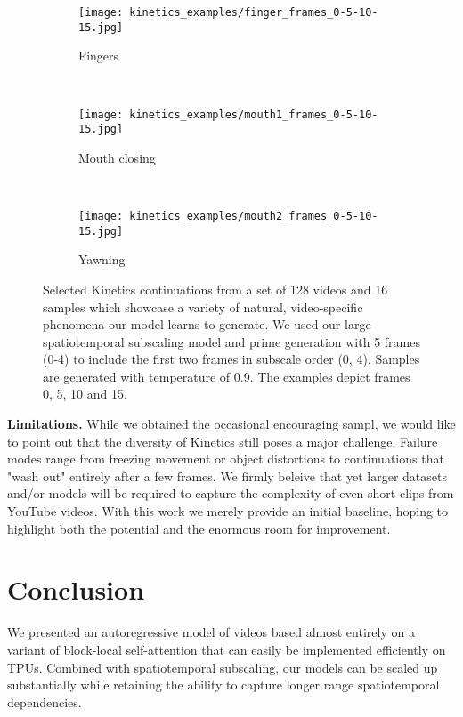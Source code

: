 \documentclass{article} \usepackage{iclr2020_conference,times}
\begin{document}
\begin{figure}[t]
    \begin{subfigure}{0.31\textwidth}
    \texttt{[image: kinetics\_examples/finger\_frames\_0-5-10-15.jpg]}\vspace{-0.5em}
    \caption{Fingers} \label{fig:finger}
    \end{subfigure}
    ~
    \begin{subfigure}{0.31\textwidth}
    \texttt{[image: kinetics\_examples/mouth1\_frames\_0-5-10-15.jpg]}\vspace{-0.5em}
    \caption{Mouth closing} \label{fig:mouth1}
    \end{subfigure}
    ~
    \begin{subfigure}{0.31\textwidth}
    \texttt{[image: kinetics\_examples/mouth2\_frames\_0-5-10-15.jpg]}\vspace{-0.5em}
    \caption{Yawning} \label{fig:yawning}
    \end{subfigure}
    \caption{\small Selected Kinetics continuations from a set of 128 videos and 16 samples which showcase a variety of natural, video-specific phenomena our model learns to generate. We used our large spatiotemporal subscaling model and prime generation with 5 frames (0-4) to include the first two frames in subscale order (0, 4). Samples are generated with temperature of 0.9. The examples depict frames 0, 5, 10 and 15.}\label{fig:qualitative}
\end{figure}

\textbf{Limitations.} While we obtained the occasional encouraging sampl, we would like to point out that the diversity of Kinetics still poses a major challenge. Failure modes range from freezing movement or object distortions to continuations that "wash out" entirely after a few frames. We firmly beleive that yet larger datasets and/or models will be required to capture the complexity of even short clips from YouTube videos. With this work we merely provide an initial baseline, hoping to highlight both the potential and the enormous room for improvement.

\section{Conclusion}
We presented an autoregressive model of videos based almost entirely on a variant of block-local self-attention that can easily be implemented efficiently on TPUs. Combined with spatiotemporal subscaling, our models can be scaled up substantially while retaining the ability to capture longer range spatiotemporal dependencies.
\end{document}
